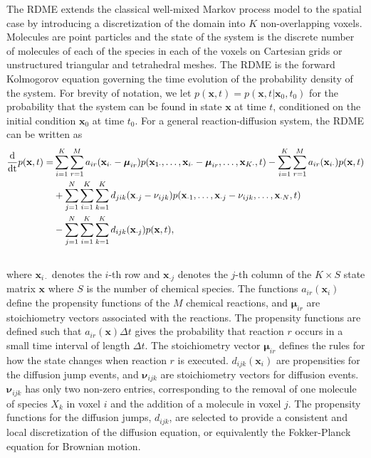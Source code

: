\documentclass[final,leqno,onefignum,onetabnum]{siamltex1213}
\def\fatx{\mathbf{x}}
\def\fatmu{\boldsymbol{\mu}}
\def\fatnu{\mathbf{\nu}}
\begin{document}
The RDME extends the classical well-mixed Markov process model \cite{SSA} to the spatial case by introducing a discretization of the domain into $K$ non-overlapping voxels. Molecules are point particles and the state of the system is the discrete number of molecules of each of the species in each of the voxels on Cartesian grids or unstructured triangular and tetrahedral meshes. 
The RDME is the forward Kolmogorov equation governing the time evolution of the probability density of the system.  
For brevity of notation, we let $p(\fatx,t) = p(\fatx,t|\fatx_0,t_0)$ for the probability that the system can be found in state $\fatx$ at time $t$, conditioned on the initial condition $\fatx_0$ at time $t_0$. For a general reaction-diffusion system, the RDME can be written as
\begin{align}
\label{eq:rdme}
\frac{\mathrm{d}}{\mathrm{dt}}p(\fatx, t) = 
&\sum_{i=1}^{K}
\sum_{r = 1}^{M}
a_{ir}(\fatx_{i \cdot}-\fatmu_{ir})p(\fatx_{1 \cdot},\ldots,\fatx_{i \cdot}-\fatmu_{ir},
\ldots,\fatx_{K \cdot}, t) \nonumber 
-\sum_{i=1}^{K}
\sum_{r = 1}^{M}
a_{ir}(\fatx_{i \cdot})p(\fatx, t)\\
&+\sum_{j=1}^{N} \sum_{i = 1}^{K} \sum_{k=1}^K d_{jik}(\fatx_{\cdot j}-\fatnu_{ijk})
p(\fatx_{\cdot 1},\ldots,\fatx_{\cdot j}-\fatnu_{ijk},
\ldots,\fatx_{\cdot N}, t) \nonumber\\
&-\sum_{j=1}^N\sum_{i=1}^{K}
\sum_{k = 1}^{K} d_{ijk}(\fatx_{\cdot j})p(\fatx, t),\nonumber\\
\vspace{-30pt}
\end{align}
\noindent
where $\fatx_{i\cdot}$ denotes the $i$-th row and $\fatx_{\cdot j}$ denotes the $j$-th column of the $K\times S$ state matrix $\fatx$ where $S$ is the number of chemical species. The functions $a_{ir}(\fatx_i)$ define the propensity functions of the $M$ chemical reactions, and $\fatmu_{ir}$ are stoichiometry vectors associated with the reactions. The propensity functions are defined such that  $a_{ir}(\fatx) \Delta t$ gives the probability that reaction $r$ occurs in a small time interval of length $\Delta t$. The stoichiometry vector  $\fatmu_{ir}$ defines the rules for how the state changes when reaction $r$ is executed. $d_{ijk}(\fatx_i)$ are propensities for the diffusion jump events, and $\fatnu_{ijk}$ are stoichiometry vectors for diffusion events. 
$\fatnu_{ijk}$ has only two non-zero entries, corresponding to the removal of one molecule of species $X_k$ in voxel $i$ and the addition of a molecule in voxel $j$.  The propensity functions for the diffusion jumps, $d_{ijk}$, are selected to provide a consistent and local discretization of the diffusion equation, or equivalently the Fokker-Planck equation for Brownian motion. 
\end{document}
